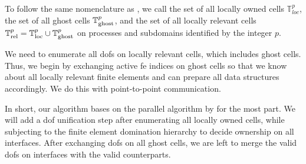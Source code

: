 To follow the same nomenclature as \cite{bangerth2012}, we call the set of all locally owned cells $\mathbb{T}^p_{loc}$, the set of all ghost cells $\mathbb{T}^p_{\text{ghost}}$, and the set of all locally relevant cells $\mathbb{T}^p_{\text{rel}} = \mathbb{T}^p_{\text{loc}} \cup \mathbb{T}^p_{\text{ghost}}$ on processes and subdomains identified by the integer $p$.

We need to enumerate all \glspl{dof} on locally relevant cells, which includes ghost cells. Thus, we begin by exchanging active fe indices on ghost cells so that we know about all locally relevant finite elements and can prepare all data structures accordingly. We do this with point-to-point communication.

In short, our algorithm bases on the parallel algorithm by \textcite{bangerth2012} for the most part. We will add a \gls{dof} unification step after enumerating all locally owned cells, while subjecting to the finite element domination hierarchy to decide ownership on all interfaces. After exchanging \glspl{dof} on all ghost cells, we are left to merge the valid \glspl{dof} on interfaces with the valid counterparts.


